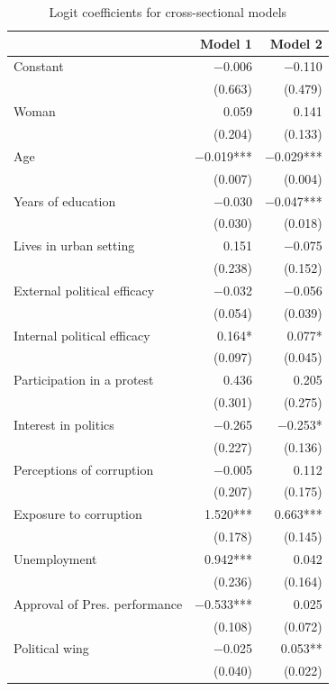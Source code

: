 \documentclass[floatsintext,man]{apa7}\usepackage[]{graphicx}\usepackage[]{color}
\begin{document}
\begin{longtable}[t]{lrr}
\caption{\label{tab:complexmodc}Logit coefficients for cross-sectional models}\\
\toprule
  & Model 1 & Model 2\\
\midrule
Constant & \num{-0.006} & \num{-0.110}\\
 & (\num{0.663}) & (\num{0.479})\\
Woman & \num{0.059} & \num{0.141}\\
 & (\num{0.204}) & (\num{0.133})\\
Age & \num{-0.019}*** & \num{-0.029}***\\
 & (\num{0.007}) & (\num{0.004})\\
Years of education & \num{-0.030} & \num{-0.047}***\\
 & (\num{0.030}) & (\num{0.018})\\
Lives in urban setting & \num{0.151} & \num{-0.075}\\
 & (\num{0.238}) & (\num{0.152})\\
External political efficacy & \num{-0.032} & \num{-0.056}\\
 & (\num{0.054}) & (\num{0.039})\\
Internal political efficacy & \num{0.164}* & \num{0.077}*\\
 & (\num{0.097}) & (\num{0.045})\\
Participation in a protest & \num{0.436} & \num{0.205}\\
 & (\num{0.301}) & (\num{0.275})\\
Interest in politics & \num{-0.265} & \num{-0.253}*\\
 & (\num{0.227}) & (\num{0.136})\\
Perceptions of corruption & \num{-0.005} & \num{0.112}\\
 & (\num{0.207}) & (\num{0.175})\\
Exposure to corruption & \num{1.520}*** & \num{0.663}***\\
 & (\num{0.178}) & (\num{0.145})\\
Unemployment & \num{0.942}*** & \num{0.042}\\
 & (\num{0.236}) & (\num{0.164})\\
Approval of Pres. performance & \num{-0.533}*** & \num{0.025}\\
 & (\num{0.108}) & (\num{0.072})\\
Political wing & \num{-0.025} & \num{0.053}**\\
 & (\num{0.040}) & (\num{0.022})\\

\end{longtable}
\end{document}
